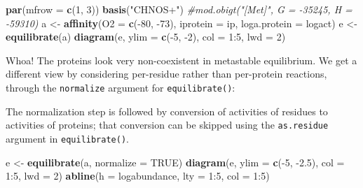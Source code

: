 \documentclass[]{tufte-book}
\newenvironment{Shaded}{}{}
\newcommand{\KeywordTok}[1]{\textcolor[rgb]{0.00,0.44,0.13}{\textbf{#1}}}
\newcommand{\DataTypeTok}[1]{\textcolor[rgb]{0.56,0.13,0.00}{#1}}
\newcommand{\DecValTok}[1]{\textcolor[rgb]{0.25,0.63,0.44}{#1}}
\newcommand{\FloatTok}[1]{\textcolor[rgb]{0.25,0.63,0.44}{#1}}
\newcommand{\StringTok}[1]{\textcolor[rgb]{0.25,0.44,0.63}{#1}}
\newcommand{\CommentTok}[1]{\textcolor[rgb]{0.38,0.63,0.69}{\textit{#1}}}
\newcommand{\OtherTok}[1]{\textcolor[rgb]{0.00,0.44,0.13}{#1}}
\newcommand{\OperatorTok}[1]{\textcolor[rgb]{0.40,0.40,0.40}{#1}}
\newcommand{\NormalTok}[1]{#1}
\begin{document}
\begin{Shaded}
\begin{Highlighting}[]
\KeywordTok{par}\NormalTok{(}\DataTypeTok{mfrow =} \KeywordTok{c}\NormalTok{(}\DecValTok{1}\NormalTok{, }\DecValTok{3}\NormalTok{))}
\KeywordTok{basis}\NormalTok{(}\StringTok{"CHNOS+"}\NormalTok{)}
\CommentTok{#mod.obigt("[Met]", G = -35245, H = -59310)}
\NormalTok{a <-}\StringTok{ }\KeywordTok{affinity}\NormalTok{(}\DataTypeTok{O2 =} \KeywordTok{c}\NormalTok{(}\OperatorTok{-}\DecValTok{80}\NormalTok{, }\OperatorTok{-}\DecValTok{73}\NormalTok{), }\DataTypeTok{iprotein =}\NormalTok{ ip, }\DataTypeTok{loga.protein =}\NormalTok{ logact)}
\NormalTok{e <-}\StringTok{ }\KeywordTok{equilibrate}\NormalTok{(a)}
\KeywordTok{diagram}\NormalTok{(e, }\DataTypeTok{ylim =} \KeywordTok{c}\NormalTok{(}\OperatorTok{-}\DecValTok{5}\NormalTok{, }\OperatorTok{-}\DecValTok{2}\NormalTok{), }\DataTypeTok{col =} \DecValTok{1}\OperatorTok{:}\DecValTok{5}\NormalTok{, }\DataTypeTok{lwd =} \DecValTok{2}\NormalTok{)}
\end{Highlighting}
\end{Shaded}

Whoa! The proteins look very non-coexistent in metastable equilibrium.
We get a different view by considering per-residue rather than
per-protein reactions, through the \texttt{normalize} argument for
{\texttt{equilibrate()}}:

\begin{marginfigure}
The normalization step is followed by conversion of activities of
residues to activities of proteins; that conversion can be skipped using
the \texttt{as.residue} argument in {\texttt{equilibrate()}}.
\end{marginfigure}

\begin{Shaded}
\begin{Highlighting}[]
\NormalTok{e <-}\StringTok{ }\KeywordTok{equilibrate}\NormalTok{(a, }\DataTypeTok{normalize =} \OtherTok{TRUE}\NormalTok{)}
\KeywordTok{diagram}\NormalTok{(e, }\DataTypeTok{ylim =} \KeywordTok{c}\NormalTok{(}\OperatorTok{-}\DecValTok{5}\NormalTok{, }\OperatorTok{-}\FloatTok{2.5}\NormalTok{), }\DataTypeTok{col =} \DecValTok{1}\OperatorTok{:}\DecValTok{5}\NormalTok{, }\DataTypeTok{lwd =} \DecValTok{2}\NormalTok{)}
\KeywordTok{abline}\NormalTok{(}\DataTypeTok{h =}\NormalTok{ logabundance, }\DataTypeTok{lty =} \DecValTok{1}\OperatorTok{:}\DecValTok{5}\NormalTok{, }\DataTypeTok{col =} \DecValTok{1}\OperatorTok{:}\DecValTok{5}\NormalTok{)}
\end{Highlighting}
\end{Shaded}
\end{document}
